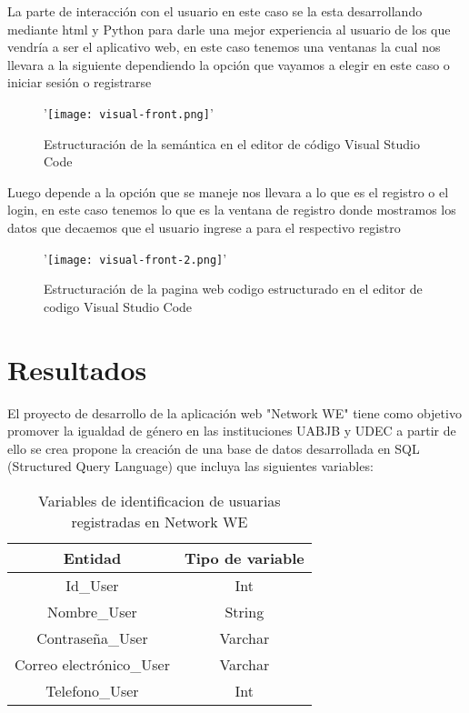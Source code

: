 \documentclass[hidelinks]{Documento}
\begin{document}
La parte de interacción con el usuario en este caso se la esta desarrollando mediante html y Python para darle una mejor experiencia al usuario de los que vendría a ser el aplicativo web, en este caso tenemos una ventanas la cual nos llevara a la siguiente dependiendo la opción que vayamos a elegir en este caso o iniciar sesión o registrarse

 \begin{figure}[h]
\centering
'\texttt{[image: visual-front.png]}'
\caption{Estructuración de la semántica en el editor de código Visual Studio Code}
\label{fig:Picture1.png}
\end{figure}

Luego depende a la opción que se maneje nos llevara a lo que es el registro o el login, en este caso tenemos lo que es la ventana de registro donde mostramos los datos que decaemos que el usuario ingrese a para el respectivo registro

 \begin{figure}[h]
\centering
'\texttt{[image: visual-front-2.png]}'
\caption{Estructuración de la pagina web codigo estructurado en el editor de codigo Visual Studio Code }
\label{fig:Picture1.png}
\end{figure}


\chapter{Resultados}

El proyecto de desarrollo de la aplicación web "Network WE" tiene como objetivo promover la igualdad de género en las instituciones UABJB y UDEC a partir de ello se crea propone la creación de una base de datos desarrollada en SQL (Structured Query Language) que incluya las siguientes variables:

    \begin{table}[htbp]
        \centering
        \caption{Variables de identificacion de usuarias registradas en Network WE}
        \label{tab:variables}
        \begin{tabular}{cc}
            \toprule
            Entidad & Tipo de variable   \\
            \midrule
            Id\_User & Int \\
            Nombre\_User & String \\
            Contraseña\_User & Varchar \\
            Correo electrónico\_User & Varchar \\
            Telefono\_User & Int \\
            \bottomrule
        \end{tabular}
    \end{table}
\end{document}
